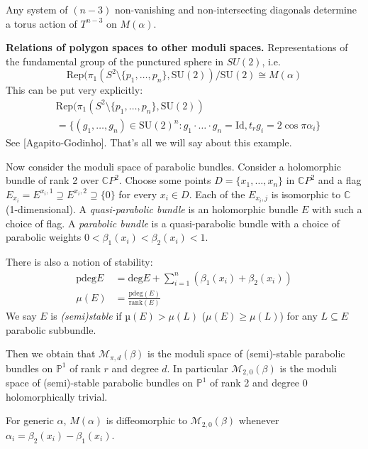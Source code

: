 \begin{remark}
\label{remark-nonva-nonin-diago}
Any system of $(n-3)$ non-vanishing
and non-intersecting diagonals determine
a torus action of $T^{n-3}$ on $M(\alpha)$.
\end{remark}

\medskip\noindent
{\bf Relations of polygon spaces to other
moduli spaces.}
Representations of the fundamental group
of the punctured sphere in $SU(2)$, i.e.
$$
\text{Rep}(\pi_1(S^2\setminus
\{p_1,\ldots,p_n\},\text{SU}(2))/\text{SU}(2)
\cong
M(\alpha)
$$
This can be put very explicitly:
$$
\begin{aligned}
&\text{Rep}(\pi_1(S^2\setminus
\{p_1,\ldots,p_n\},\text{SU}(2))\\
&=\{(g_1,\ldots,g_n)\in
\text{SU}(2)^n:g_1\cdot\ldots\cdot
g_n=\text{Id},
t_rg_i=2\cos\pi \alpha_i\}
\end{aligned}
$$
See [Agapito-Godinho]. That's all we
will say about this example.

\medskip\noindent
Now consider the moduli space of parabolic
bundles.
Consider a holomorphic bundle of rank 2 over
$\mathbb{C}P^{2}$.
Choose some points $D=\{x_1,\ldots,x_n\}$ in
$\mathbb{C}P^{2}$
and a flag
$E_{x_i}=E^{x_i,1}\supseteq
E^{x_i,2}\supseteq \{0\}$
for every $x_i \in D$. Each of the
$E_{x_i,j}$ is isomorphic to $\mathbb{C}$
(1-dimensional).
A {\it quasi-parabolic bundle}
is an holomorphic bundle $E$
with such a choice of flag.
A {\it parabolic bundle} is a quasi-parabolic
bundle with a choice of parabolic weights
$0< \beta_1(x_i)< \beta_2(x_i)<1$.

There is also a notion of stability:
$$
\begin{aligned}
\text{pdeg}E&=\text{deg}E+ \sum_{i=1}^n
(\beta_1(x_i)+\beta_2(x_i))\\
\mu(E)&=\frac{\text{pdeg}(E)}{\text{rank}(E)}
\end{aligned}
$$
We say $E$ is {\it (semi)stable} if
$µ(E)> \mu(L)$ ($\mu(E) \geq \mu(L)$)
for any $L \subseteq E$ parabolic
subbundle.

Then we obtain that
$\mathcal{M}_{\pi,d}(\beta)$
is the moduli space of (semi)-stable
parabolic bundles on $\mathbb{P}^1$
of rank $r$ and degree $d$.
In particular $\mathcal{M}_{2,0}(\beta)$
is the moduli space of (semi)-stable
parabolic
bundles on $\mathbb{P}^1$ of rank 2 and
degree 0
holomorphically trivial.

\begin{theorem}
\label{theorem-Jeffrey-Godinho}
For generic $ \alpha$,
$M(\alpha)$ is diffeomorphic to
$\mathcal{M}_{2,0}(\beta)$
whenever
$\alpha_i=\beta_2(x_i)-\beta_1(x_i)$.
\end{theorem}

